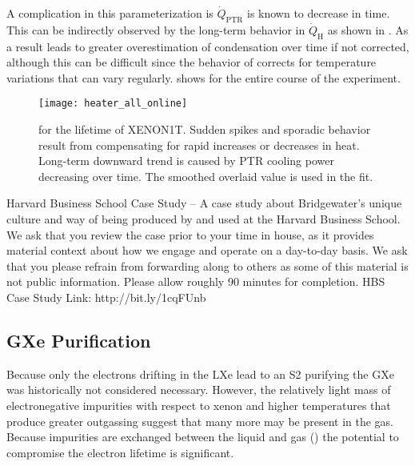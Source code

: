 A complication in this parameterization is $\dot{Q}_{\mathrm{PTR}}$ is known to decrease in time.  This can be indirectly observed by
the long-term behavior in $\dot{Q}_{\mathrm{H}}$ as shown in .  As a result
 leads to greater overestimation of condensation over time if not
corrected, although this can be difficult since the behavior of \qdh corrects for temperature variations that can vary
regularly.   shows \qdh for the entire course of the experiment.

\begin{figure}
\centering
\texttt{[image: heater\_all\_online]}
\caption{\qdh for the lifetime of XENON1T.  Sudden spikes and sporadic behavior result from compensating for rapid increases or decreases
in heat.  Long-term downward trend is caused by PTR cooling power decreasing over time.  The smoothed overlaid value is used in the fit.}
\label{fig:electron_lifetime_model_vap_and_cond_heater_all}
\end{figure}

Harvard Business School Case Study – A case study about Bridgewater’s unique culture and way of being produced by and used at the
Harvard Business School. We ask that you review the case prior to your time in house, as it provides material context about
how we engage and operate on a day-to-day basis.  We ask that you please refrain from forwarding along to others as some of this
material is not public information.   Please allow roughly 90 minutes for
completion.  HBS Case Study Link: http://bit.ly/1cqFUnb



\subsection{GXe Purification}
\label{subsec:electron_lifetime_model_gxe}
Because only the electrons drifting in the LXe lead to an S2 purifying the GXe was historically not considered necessary.  However,
the relatively light mass of electronegative impurities with respect to xenon and higher temperatures that produce greater outgassing
suggest that many more may be present in the gas.  Because
impurities are exchanged between the liquid and gas () the potential to compromise
the electron lifetime is significant.


